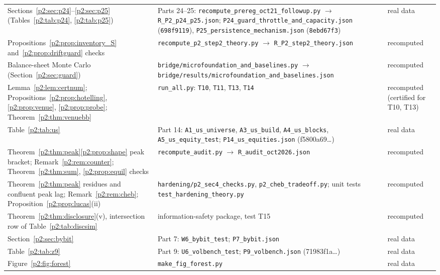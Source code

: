 \begin{longtable}{p{}p{}p{}}
Sections~\ref{p2:sec:p24}--\ref{p2:sec:p25} (Tables~\ref{p2:tab:p24}, \ref{p2:tab:p25}) & Parts 24--25: \texttt{recompute\_\allowbreak prereg\_\allowbreak oct21\_\allowbreak followup.py} $\to$ \texttt{R\_P2\_\allowbreak p24\_\allowbreak p25.json}; \texttt{P24\_\allowbreak guard\_\allowbreak throttle\_\allowbreak and\_\allowbreak capacity.json} (\texttt{698f9119}), \texttt{P25\_\allowbreak persistence\_\allowbreak mechanism.json} (\texttt{8ebd67f3}) & real data\\
Propositions~\ref{p2:prop:inventory_S} and~\ref{p2:prop:driftguard} checks & \texttt{recompute\_\allowbreak p2\_\allowbreak step2\_\allowbreak theory.py} $\to$ \texttt{R\_P2\_\allowbreak step2\_\allowbreak theory.json} & recomputed\\
Balance-sheet Monte Carlo (Section~\ref{p2:sec:guard}) & \texttt{bridge/\allowbreak microfoundation\_\allowbreak and\_\allowbreak baselines.py} $\to$ \texttt{bridge/\allowbreak results/\allowbreak microfoundation\_\allowbreak and\_\allowbreak baselines.json} & recomputed\\
Lemma~\ref{p2:lem:certnum}; Propositions~\ref{p2:prop:hotelling}, \ref{p2:prop:venue}, \ref{p2:prop:probe}; Theorem~\ref{p2:thm:venuebb} & \texttt{run\_all.py}: \texttt{T10}, \texttt{T11}, \texttt{T13}, \texttt{T14} & recomputed (certified for T10, T13)\\
Table~\ref{p2:tab:us} & Part 14: \texttt{A1\_us\_universe}, \texttt{A3\_us\_build}, \texttt{A4\_us\_blocks}, \texttt{A5\_us\_equity\_test}; \texttt{P14\_us\_equities.json} (f5800a69\ldots) & real data\\
Theorem~\ref{p2:thm:peak}\ref{p2:prop:shape} peak bracket; Remark~\ref{p2:rem:counter}; Theorem~\ref{p2:thm:sum}, \ref{p2:prop:equil} checks & \texttt{recompute\_audit.py} $\to$ \texttt{R\_audit\_oct2026.json} & recomputed\\
Theorem~\ref{p2:thm:peak} residues and confluent peak lag; Remark~\ref{p2:rem:cheb}; Proposition~\ref{p2:prop:lucas}(ii) & \texttt{hardening/p2\_sec4\_checks.py}, \texttt{p2\_cheb\_tradeoff.py}; unit tests \texttt{test\_hardening\_theory.py} & recomputed\\
Theorem~\ref{p2:thm:disclosure}(v), intersection row of Table~\ref{p2:tab:discsim} & information-safety package, test T15 & recomputed\\
Section~\ref{p2:sec:bybit} & Part 7: \texttt{W6\_bybit\_test}; \texttt{P7\_bybit.json} & real data\\
Table~\ref{p2:tab:z9} & Part 9: \texttt{U6\_volbench\_test}; \texttt{P9\_volbench.json} (71983f1a\ldots) & real data\\
Figure~\ref{p2:fig:forest} & \texttt{make\_fig\_forest.py} & real data\\
\bottomrule
\end{longtable}




